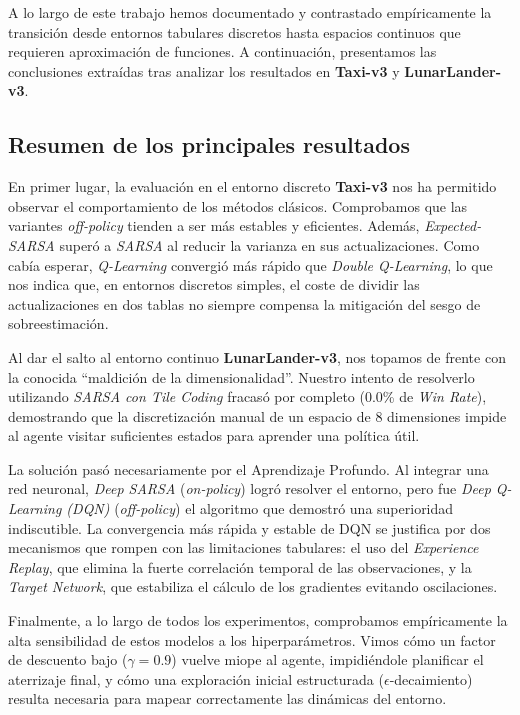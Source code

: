 A lo largo de este trabajo hemos documentado y contrastado empíricamente la transición desde entornos tabulares discretos hasta espacios continuos que requieren aproximación de funciones. A continuación, presentamos las conclusiones extraídas tras analizar los resultados en \textbf{Taxi-v3} y \textbf{LunarLander-v3}.

\subsection{Resumen de los principales resultados}

En primer lugar, la evaluación en el entorno discreto \textbf{Taxi-v3} nos ha permitido observar 
el comportamiento de los métodos clásicos. Comprobamos que las variantes \textit{off-policy} tienden 
a ser más estables y eficientes. Además, \textit{Expected-SARSA} superó a \textit{SARSA} al 
reducir la varianza en sus actualizaciones. Como cabía esperar, \textit{Q-Learning} convergió más rápido 
que \textit{Double Q-Learning}, lo que nos indica que, en entornos discretos simples, el coste de 
dividir las actualizaciones en dos tablas no siempre compensa la mitigación del sesgo de sobreestimación.

Al dar el salto al entorno continuo \textbf{LunarLander-v3}, nos topamos de frente con la conocida 
``maldición de la dimensionalidad''. Nuestro intento de resolverlo utilizando \textit{SARSA con Tile Coding} 
fracasó por completo (0.0\% de \textit{Win Rate}), demostrando que la discretización manual de un espacio de 
8 dimensiones impide al agente visitar suficientes estados para aprender una política útil.

La solución pasó necesariamente por el Aprendizaje Profundo. Al integrar una red neuronal, \textit{Deep SARSA} 
(\textit{on-policy}) logró resolver el entorno, pero fue \textit{Deep Q-Learning (DQN)} (\textit{off-policy}) 
el algoritmo que demostró una superioridad indiscutible. La convergencia más rápida y estable de
 DQN se justifica por dos mecanismos que rompen con las limitaciones tabulares: el uso del \textit{Experience Replay}, 
 que elimina la fuerte correlación temporal de las observaciones, y la \textit{Target Network}, que estabiliza el 
 cálculo de los gradientes evitando oscilaciones.

Finalmente, a lo largo de todos los experimentos, comprobamos empíricamente la alta sensibilidad de estos modelos 
a los hiperparámetros. Vimos cómo un factor de descuento bajo ($\gamma = 0.9$) vuelve miope al agente, impidiéndole 
planificar el aterrizaje final, y cómo una exploración inicial estructurada ($\epsilon$-decaimiento) resulta 
necesaria para mapear correctamente las dinámicas del entorno.

